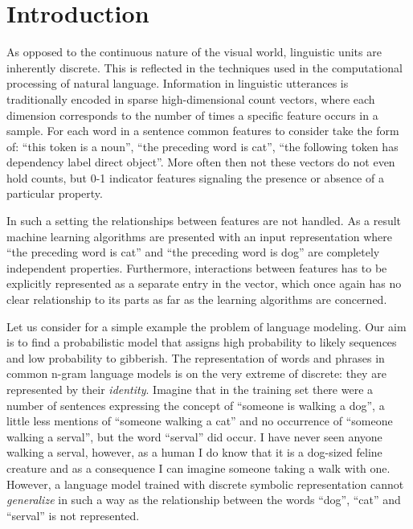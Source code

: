 
\chapter{Introduction}
\label{introducion}
As opposed to the continuous nature of the visual world, linguistic units
are inherently discrete. This is reflected in the techniques used in the
computational processing of natural language.
Information in linguistic utterances is traditionally encoded
in sparse high-dimensional count vectors, where each
dimension corresponds to the number of times a specific feature occurs in a
sample. For each word in a sentence common features to consider take the form of:
``this token is a noun'', ``the preceding word is cat'',
``the following token has dependency label direct object''.
More often then not these vectors do not even hold counts, but 0-1
indicator features signaling the presence or absence of a particular property.

In such a setting the relationships between features are not handled.
As a result machine learning algorithms are presented with an input representation where
``the preceding word is cat'' and ``the preceding word is dog''
are completely independent properties.
Furthermore, interactions between features has to be
explicitly represented as a separate entry in the vector, which once again has
no clear relationship to its parts as far as the learning algorithms are concerned.

Let us consider for a simple example the problem of language modeling.
Our  aim is to find a probabilistic model
that assigns high probability to likely sequences and low probability to gibberish.
The representation of words and phrases in common n-gram language models is on the
very extreme of discrete: they are represented by their \emph{identity}.
Imagine that in the training set there were a number of sentences expressing the concept
of ``someone is walking a dog'', a little less mentions of ``someone walking a cat''
and no occurrence of ``someone walking a serval'', but the word ``serval'' did occur.
I have never seen anyone walking a serval, however, as a human I do know that it is a dog-sized
feline creature and as a consequence I can imagine someone taking a walk with one.
However, a language model trained with discrete symbolic representation cannot
\emph{generalize} in such a way as the
relationship between the words ``dog'', ``cat'' and ``serval'' is not represented.

